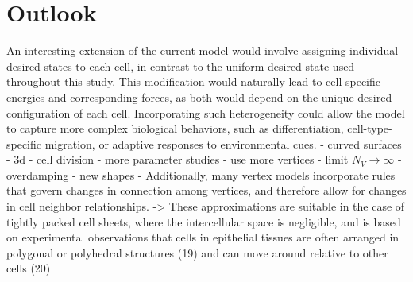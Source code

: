 \section{Outlook}

An interesting extension of the current model would involve assigning individual desired states to each cell, in contrast to the uniform desired state used throughout this study. 
This modification would naturally lead to cell-specific energies and corresponding forces, as both would depend on the unique desired configuration of each cell. 
Incorporating such heterogeneity could allow the model to capture more complex biological behaviors, such as differentiation, cell-type-specific migration, or adaptive responses to environmental cues. 
- curved surfaces 
- 3d 
- cell division 
- more parameter studies 
- use more vertices  
- limit $N_V \rightarrow \infty$ 
- overdamping 
- new shapes  
-  Additionally, many vertex models incorporate rules that govern changes in connection among vertices, and therefore allow for changes in cell neighbor relationships.
->  These approximations are suitable in the case of tightly packed cell sheets, where the intercellular space is negligible, and is based on experimental observations that cells in epithelial tissues are often arranged in polygonal or polyhedral structures (19) and can move around relative to other cells (20)
